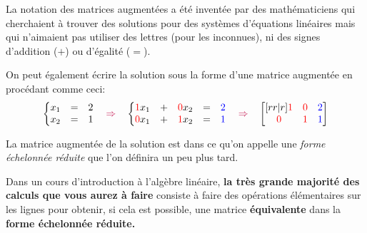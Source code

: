\begin{NotDef}
La notation des matrices augmentées a été inventée par des mathématiciens qui cherchaient à trouver des solutions
pour des systèmes d'équations linéaires mais qui n'aimaient
pas utiliser des lettres (pour les inconnues), ni des signes
d'addition ($+$) ou d'égalité ($=$).
\end{NotDef}

On peut également écrire la solution sous la forme
d'une matrice augmentée en procédant comme ceci:
\[
\left\{
\begin{matrix}
x_1 &=& 2\\
x_2 &=& 1
\end{matrix}
\right.
\quad {\color{purple}\Rightarrow}\quad
\left\{
\begin{matrix}
{\color{red}1} x_1 &+& {\color{red}0}x_2 &=& {\color{blue}2}\\
{\color{red}0} x_1 &+& {\color{red}1}x_2 &=& {\color{blue}1}
\end{matrix}
\right.
\quad {\color{purple}\Rightarrow}\quad
\begin{bmatrix}[rr|r]
{\color{red}1} & {\color{red}0} & {\color{blue}2}\\
{\color{red}0} & {\color{red}1} & {\color{blue}1}
\end{bmatrix}
\]

La matrice augmentée de la solution est dans ce qu'on
appelle une \textit{forme échelonnée réduite} que l'on définira un peu plus tard.

Dans un cours d'introduction à l'algèbre linéaire, \textbf{la très grande majorité des calculs que vous aurez
à faire} consiste à faire des opérations élémentaires sur les lignes
pour obtenir, si cela est possible, une matrice
\textbf{équivalente} dans la \textbf{forme échelonnée réduite.}

